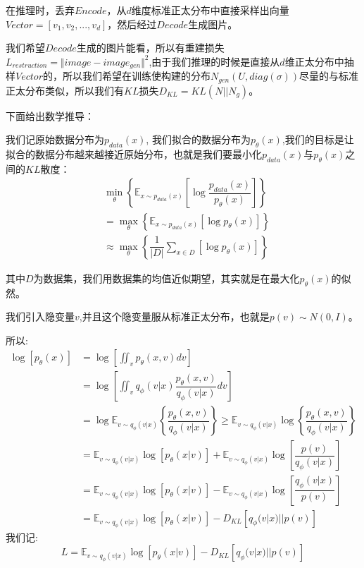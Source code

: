 \documentclass[withoutpreface,bwprint]{cumcmthesis} %
\begin{document}
	在推理时，丢弃$Encode$，从$d$维度标准正太分布中直接采样出向量$Vector=\left[v_1,v_2,...,v_d\right]$，然后经过$Decode$生成图片。
	
	我们希望$Decode$生成的图片能看，所以有重建损失$L_{restruction}=\Vert image-image_{gen} \Vert^{2}$,由于我们推理的时候是直接从$d$维正太分布中抽样$Vector$的，所以我们希望在训练使构建的分布$N_{gen}(U,diag(\sigma))$尽量的与标准正太分布类似，所以我们有$KL$损失$D_{KL}=KL(N||N_g)$。
	
	下面给出数学推导：
	
	我们记原始数据分布为$p_{data}(x)$, 我们拟合的数据分布为$p_{\theta}(x)$,我们的目标是让拟合的数据分布越来越接近原始分布，也就是我们要最小化$p_{data}(x)$与$p_{\theta}(x)$之间的$KL$散度：
	\begin{align*}
		 &\mathop{min}\limits_{\theta} \left\{\mathbb{E}_{x \sim p_{data}(x)} \left[\log \dfrac{p_{data}(x)}{p_{\theta}(x)} \right] \right\}\\
		 & =  \mathop{max}\limits_{\theta}  \left\{ \mathbb{E}_{x \sim p_{data}(x)} \left[\log {p_{\theta}(x)} \right]  \right\}  \\
		 & \approx \mathop{max}\limits_{\theta} \left\{ \dfrac{1}{|D|}\sum_{x \in D} \left[\log {p_{\theta}(x)} \right] \right\}
	\end{align*}

	其中$D$为数据集，我们用数据集的均值近似期望，其实就是在最大化$p_{\theta}(x)$的似然。
	
	我们引入隐变量$v$,并且这个隐变量服从标准正太分布，也就是$p(v) \sim N(0,I)$。
	
	所以:
	\begin{align*}
		\log \left[ p_{\theta}(x) \right]  & = \log \left[\iint_v p_{\theta}(x,v) dv \right] \\
								& =\log  \left[\iint_v q_{\phi}(v|x) \dfrac{p_{\theta}(x,v)}{q_{\phi}(v|x)} dv \right] \\
								& = \log \mathbb{E}_{ v \sim q_{\phi}(v|x) } \left\{ \dfrac{p_{\theta}(x,v)}{q_{\phi}(v|x)} \right\} \geq \mathbb{E}_{ v \sim q_{\phi}(v|x) } \log \left\{ \dfrac{p_{\theta}(x,v)}{q_{\phi}(v|x)} \right\} \\
								& = \mathbb{E}_{ v \sim q_{\phi}(v|x) }  \log \left[ p_{\theta}(x|v) \right] +  \mathbb{E}_{ v \sim q_{\phi}(v|x) } \log \left[ \dfrac{p(v)}{q_{\phi}(v|x)} \right] \\  
								& = \mathbb{E}_{ v \sim q_{\phi}(v|x) }  \log \left[ p_{\theta}(x|v) \right] - \mathbb{E}_{ v \sim q_{\phi}(v|x) } \log \left[ \dfrac{q_{\phi}(v|x)}{p(v)} \right] \\
								& = \mathbb{E}_{ v \sim q_{\phi}(v|x) }  \log \left[ p_{\theta}(x|v) \right] - D_{KL} \left[ q_{\phi}(v|x)||p(v) \right]
	\end{align*}
	我们记:
	$$
		L= \mathbb{E}_{ v \sim q_{\phi}(v|x) }  \log \left[ p_{\theta}(x|v) \right] - D_{KL} \left[ q_{\phi}(v|x)||p(v) \right]
	$$
\end{document}
